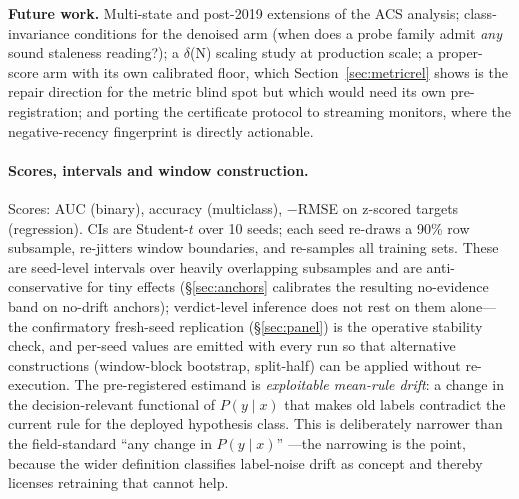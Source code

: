 \documentclass[10pt]{article} %
\begin{document}
\textbf{Future work.} Multi-state and post-2019 extensions of the ACS analysis; class-invariance
conditions for the denoised arm (when does a probe family admit \emph{any} sound staleness reading?); a
$\delta$(N) scaling study at production scale; a proper-score arm with its own calibrated floor, which
Section~\ref{sec:metricrel} shows is the repair direction for the metric blind spot but which would need its own
pre-registration; and porting the certificate protocol to streaming monitors, where the
negative-recency fingerprint is directly actionable.

\paragraph{Scores, intervals and window construction.}

Scores: AUC (binary), accuracy (multiclass), $-$RMSE on z-scored targets (regression). CIs are Student-$t$ over 10 seeds; each seed re-draws a 90\% row subsample, re-jitters window boundaries, and re-samples all training sets. These are seed-level intervals over heavily overlapping subsamples and are anti-conservative for tiny effects (\S\ref{sec:anchors} calibrates the resulting no-evidence band on no-drift anchors); verdict-level inference does not rest on them alone---the confirmatory fresh-seed replication (\S\ref{sec:panel}) is the operative stability check, and per-seed values are emitted with every run so that alternative constructions (window-block bootstrap, split-half) can be applied without re-execution. The pre-registered estimand is \emph{exploitable mean-rule drift}: a change in the decision-relevant functional of $P(y \mid x)$ that makes old labels contradict the current rule for the deployed hypothesis class. This is deliberately narrower than the field-standard ``any change in $P(y \mid x)$'' \citep{morenotorres2012unifying,webb2016characterizing}---the narrowing is the point, because the wider definition classifies label-noise drift as concept and thereby licenses retraining that cannot help.
\end{document}
